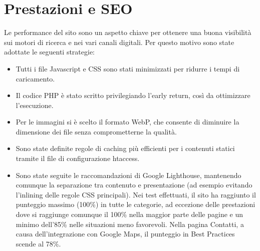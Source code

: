 \section{Prestazioni e SEO}

Le performance del sito sono un aspetto chiave per ottenere una buona visibilità sui motori di ricerca e nei vari canali digitali. Per questo motivo sono state adottate le seguenti strategie:
\begin{itemize}
    \item Tutti i file Javascript e CSS sono stati minimizzati per ridurre i tempi di caricamento.
    \item Il codice PHP è stato scritto privilegiando l’early return, così da ottimizzare l’esecuzione.
    \item Per le immagini si è scelto il formato WebP, che consente di diminuire la dimensione dei file senza comprometterne la qualità.
    \item Sono state definite regole di caching più efficienti per i contenuti statici tramite il file di configurazione htaccess.
    \item Sono state seguite le raccomandazioni di Google Lighthouse, mantenendo comunque la separazione tra contenuto e presentazione (ad esempio evitando l’inlining delle regole CSS principali). Nei test effettuati, il sito ha raggiunto il punteggio massimo (100\%) in tutte le categorie, ad eccezione delle prestazioni dove si raggiunge comunque il 100\% nella maggior parte delle pagine e un minimo dell’85\% nelle situazioni meno favorevoli. Nella pagina Contatti, a causa dell’integrazione con Google Maps, il punteggio in Best Practices scende al 78\%.
\end{itemize}
